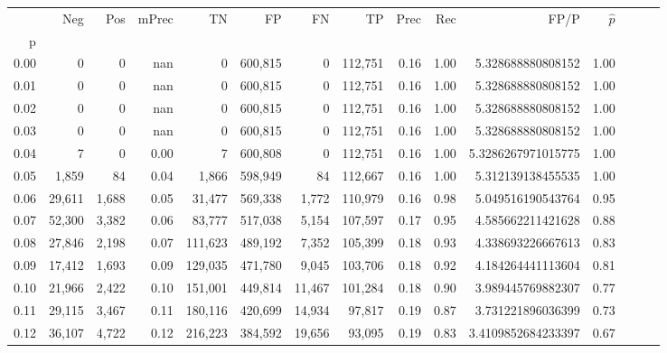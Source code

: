 \begin{tabular}{rrrrrrrrrrrrrrr}
\toprule
{} &     Neg &    Pos & mPrec &       TN &       FP &       FN &       TP &  Prec &   Rec &                    FP/P & $\hat{p}$ \\
p    &         &        &       &          &          &          &          &       &       &                         &           \\
\midrule
0.00 &       0 &      0 &   nan &        0 &  600,815 &        0 &  112,751 &  0.16 &  1.00 &       5.328688880808152 &      1.00 \\
0.01 &       0 &      0 &   nan &        0 &  600,815 &        0 &  112,751 &  0.16 &  1.00 &       5.328688880808152 &      1.00 \\
0.02 &       0 &      0 &   nan &        0 &  600,815 &        0 &  112,751 &  0.16 &  1.00 &       5.328688880808152 &      1.00 \\
0.03 &       0 &      0 &   nan &        0 &  600,815 &        0 &  112,751 &  0.16 &  1.00 &       5.328688880808152 &      1.00 \\
0.04 &       7 &      0 &  0.00 &        7 &  600,808 &        0 &  112,751 &  0.16 &  1.00 &      5.3286267971015775 &      1.00 \\
0.05 &   1,859 &     84 &  0.04 &    1,866 &  598,949 &       84 &  112,667 &  0.16 &  1.00 &       5.312139138455535 &      1.00 \\
0.06 &  29,611 &  1,688 &  0.05 &   31,477 &  569,338 &    1,772 &  110,979 &  0.16 &  0.98 &       5.049516190543764 &      0.95 \\
0.07 &  52,300 &  3,382 &  0.06 &   83,777 &  517,038 &    5,154 &  107,597 &  0.17 &  0.95 &       4.585662211421628 &      0.88 \\
0.08 &  27,846 &  2,198 &  0.07 &  111,623 &  489,192 &    7,352 &  105,399 &  0.18 &  0.93 &       4.338693226667613 &      0.83 \\
0.09 &  17,412 &  1,693 &  0.09 &  129,035 &  471,780 &    9,045 &  103,706 &  0.18 &  0.92 &       4.184264441113604 &      0.81 \\
0.10 &  21,966 &  2,422 &  0.10 &  151,001 &  449,814 &   11,467 &  101,284 &  0.18 &  0.90 &       3.989445769882307 &      0.77 \\
0.11 &  29,115 &  3,467 &  0.11 &  180,116 &  420,699 &   14,934 &   97,817 &  0.19 &  0.87 &       3.731221896036399 &      0.73 \\
0.12 &  36,107 &  4,722 &  0.12 &  216,223 &  384,592 &   19,656 &   93,095 &  0.19 &  0.83 &      3.4109852684233397 &      0.67 \\

\end{tabular}
